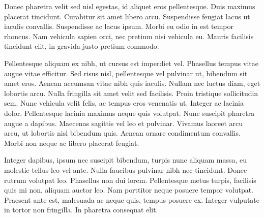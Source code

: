 Donec pharetra velit sed nisl egestas, id aliquet eros pellentesque. Duis maximus placerat tincidunt. Curabitur sit amet libero arcu. Suspendisse feugiat lacus ut iaculis convallis. Suspendisse ac lacus ipsum. Morbi eu odio in est tempor rhoncus. Nam vehicula sapien orci, nec pretium nisi vehicula eu. Mauris facilisis tincidunt elit, in gravida justo pretium commodo.

Pellentesque aliquam ex nibh, ut cursus est imperdiet vel. Phasellus tempus vitae augue vitae efficitur. Sed risus nisl, pellentesque vel pulvinar ut, bibendum sit amet eros. Aenean accumsan vitae nibh quis iaculis. Nullam nec luctus diam, eget lobortis arcu. Nulla fringilla sit amet velit sed facilisis. Proin tristique sollicitudin sem. Nunc vehicula velit felis, ac tempus eros venenatis ut. Integer ac lacinia dolor. Pellentesque lacinia maximus neque quis volutpat. Nunc suscipit pharetra augue a dapibus. Maecenas sagittis vel leo et pulvinar. Vivamus laoreet arcu arcu, ut lobortis nisl bibendum quis. Aenean ornare condimentum convallis. Morbi non neque ac libero placerat feugiat.

Integer dapibus, ipsum nec suscipit bibendum, turpis nunc aliquam massa, eu molestie tellus leo vel ante. Nulla faucibus pulvinar nibh nec tincidunt. Donec rutrum volutpat leo. Phasellus non dui lorem. Pellentesque metus turpis, facilisis quis mi non, aliquam auctor leo. Nam porttitor neque posuere tempor volutpat. Praesent ante est, malesuada ac neque quis, tempus posuere ex. Integer vulputate in tortor non fringilla. In pharetra consequat elit.
